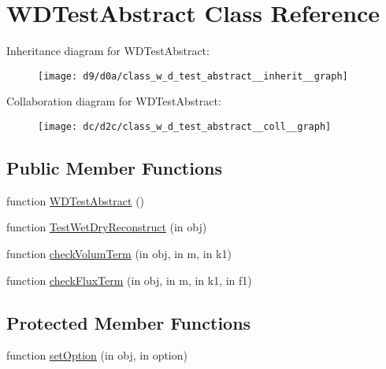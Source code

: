 \hypertarget{class_w_d_test_abstract}{}\section{W\+D\+Test\+Abstract Class Reference}
\label{class_w_d_test_abstract}


Inheritance diagram for W\+D\+Test\+Abstract\+:
\nopagebreak
\begin{figure}[H]
\begin{center}
\leavevmode
\texttt{[image: d9/d0a/class\_w\_d\_test\_abstract\_\_inherit\_\_graph]}
\end{center}
\end{figure}


Collaboration diagram for W\+D\+Test\+Abstract\+:
\nopagebreak
\begin{figure}[H]
\begin{center}
\leavevmode
\texttt{[image: dc/d2c/class\_w\_d\_test\_abstract\_\_coll\_\_graph]}
\end{center}
\end{figure}
\subsection*{Public Member Functions}
\begin{DoxyCompactItemize}
\item 
function \hyperlink{class_w_d_test_abstract_a9362b170667207f0a45cf0d5ac3f582d}{W\+D\+Test\+Abstract} ()
\item 
function \hyperlink{class_w_d_test_abstract_ac0bd990b6c6433a718a9db41e08fd11e}{Test\+Wet\+Dry\+Reconstruct} (in obj)
\item 
function \hyperlink{class_w_d_test_abstract_a7a2ffb372c2291afde7dfa96cdc5fb93}{check\+Volum\+Term} (in obj, in m, in k1)
\item 
function \hyperlink{class_w_d_test_abstract_a84a7437b0681415680c5f32fbe7fbe91}{check\+Flux\+Term} (in obj, in m, in k1, in f1)
\end{DoxyCompactItemize}
\subsection*{Protected Member Functions}
\begin{DoxyCompactItemize}
\item 
function \hyperlink{class_w_d_test_abstract_aadf0278a7b44e6ed5423257c68bc1b54}{set\+Option} (in obj, in option)
\end{DoxyCompactItemize}


